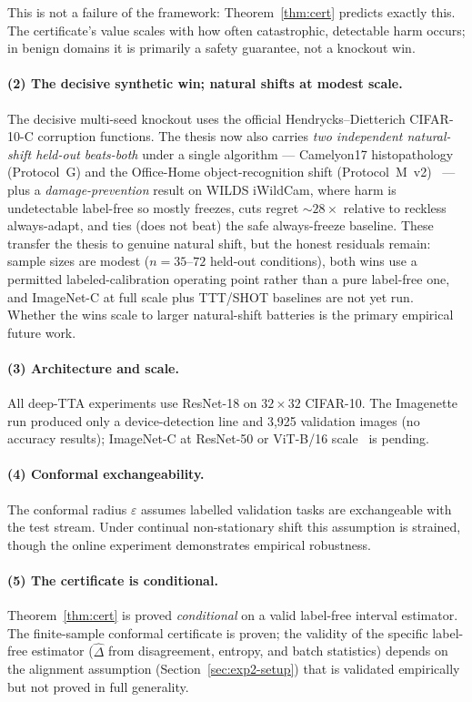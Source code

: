 This is not a failure of the framework: Theorem~\ref{thm:cert} predicts exactly
this.  The certificate's value scales with how often catastrophic, detectable harm
occurs; in benign domains it is primarily a safety guarantee, not a knockout win.

\paragraph{(2) The decisive synthetic win; natural shifts at modest scale.}
The decisive multi-seed knockout uses the official Hendrycks--Dietterich CIFAR-10-C
corruption functions.  The thesis now also carries \emph{two independent
natural-shift held-out beats-both} under a single algorithm --- Camelyon17
histopathology (Protocol~G) and the Office-Home object-recognition shift
(Protocol~M~v2)~\cite{koh2021wilds,venkateswara2017officehome} --- plus a
\emph{damage-prevention} result on WILDS iWildCam, where harm is undetectable
label-free so \KGA{} mostly freezes, cuts regret ${\sim}28{\times}$ relative to
reckless always-adapt, and ties (does not beat) the safe always-freeze baseline.
These transfer the thesis to genuine natural shift, but the honest residuals remain:
sample sizes are modest ($n{=}35$--$72$ held-out conditions), both wins use a
permitted labeled-calibration operating point rather than a pure label-free one, and
ImageNet-C at full scale plus TTT/SHOT baselines are not yet run.  Whether the wins
scale to larger natural-shift batteries is the primary empirical future work.

\paragraph{(3) Architecture and scale.}
All deep-TTA experiments use ResNet-18 on $32{\times}32$ CIFAR-10.  The Imagenette
run produced only a device-detection line and 3,925 validation images (no
accuracy results); ImageNet-C at ResNet-50 or ViT-B/16
scale~\cite{dosovitskiy2021vit,he2016resnet} is pending.

\paragraph{(4) Conformal exchangeability.}
The conformal radius $\varepsilon$ assumes labelled validation tasks are exchangeable
with the test stream.  Under continual non-stationary shift this assumption is
strained, though the online experiment demonstrates empirical robustness.

\paragraph{(5) The certificate is conditional.}
Theorem~\ref{thm:cert} is proved \emph{conditional} on a valid label-free interval
estimator.  The finite-sample conformal certificate is proven; the validity of the
specific label-free estimator ($\widehat{\Delta}$ from disagreement, entropy, and
batch statistics) depends on the alignment assumption (Section~\ref{sec:exp2-setup})
that is validated empirically but not proved in full generality.

